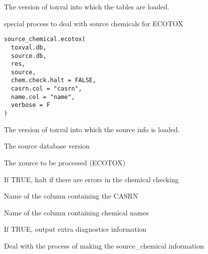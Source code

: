 \documentclass[letterpaper]{book}
\begin{document}
%
\begin{Arguments}
\begin{ldescription}
\item[\code{db}] The version of toxval into which the tables are loaded.
\end{ldescription}
\end{Arguments}
%
\begin{Description}\relax
special process to deal with source chemicals for ECOTOX
\end{Description}
%
\begin{Usage}
\begin{verbatim}
source_chemical.ecotox(
  toxval.db,
  source.db,
  res,
  source,
  chem.check.halt = FALSE,
  casrn.col = "casrn",
  name.col = "name",
  verbose = F
)
\end{verbatim}
\end{Usage}
%
\begin{Arguments}
\begin{ldescription}
\item[\code{toxval.db}] The version of toxval into which the source info is loaded.

\item[\code{source.db}] The source database version

\item[\code{source}] The xource to be processed (ECOTOX)

\item[\code{chem.check.halt}] If TRUE, halt if there are errors in the chemical checking

\item[\code{casrn.col}] Name of the column containing the CASRN

\item[\code{name.col}] Name of the column containing chemical names

\item[\code{verbose}] If TRUE, output extra diagnostics information
\end{ldescription}
\end{Arguments}
%
\begin{Description}\relax
Deal with the process of making the source\_chemical information
\end{Description}
\end{document}
